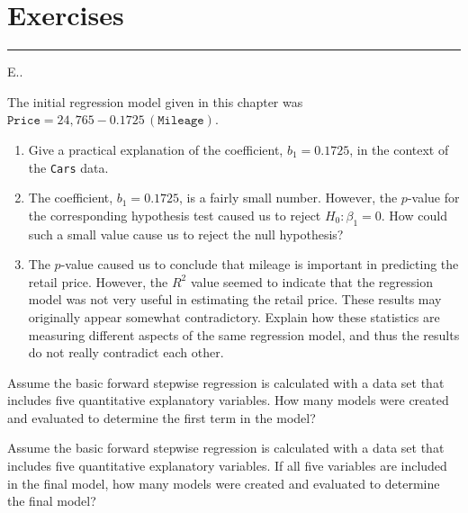 \documentclass[
]{report}
\newcounter{excount}
\begin{document}
\hypertarget{exercises-2}{%
\section*{\texorpdfstring{\textbf{Exercises}}{Exercises}}\label{exercises-2}}

\vspace{-2em}

\noindent

\rule{\linewidth}{0.4pt}

\renewcommand{\theexcountlr}{E.\arabic{excountlr}}

\begin{list}{E..}{ \setlength{\itemsep}{1.2em}}

  \item The initial regression model given in this chapter was $\texttt{Price} = 24,\!765 - 0.1725\,(\texttt{Mileage})$.
    \begin{enumerate}
      \item Give a practical explanation of the coefficient, $b_1 = 0.1725$, in the context of the \texttt{Cars} data.
      \item The coefficient, $b_1 = 0.1725$, is a fairly small number. However, the $p$-value for the corresponding hypothesis test caused us to reject $H_0\!: \beta_1 = 0$. How could such a small value cause us to reject the null hypothesis?
      \item The $p$-value caused us to conclude that mileage is important in predicting the retail price. However, the $R^2$ value seemed to indicate that the regression model was not very useful in estimating the retail price. These results may originally appear somewhat contradictory. Explain how these statistics are measuring different aspects of the same regression model, and thus the results do not really contradict each other.
    \end{enumerate}

  \item Assume the basic forward stepwise regression is calculated with a data set that includes five quantitative explanatory variables. How many models were created and evaluated to determine the first term in the model?

  \item Assume the basic forward stepwise regression is calculated with a data set that includes five quantitative explanatory variables. If all five variables are included in the final model, how many models were created and evaluated to determine the final model?


\end{list}
\end{document}

